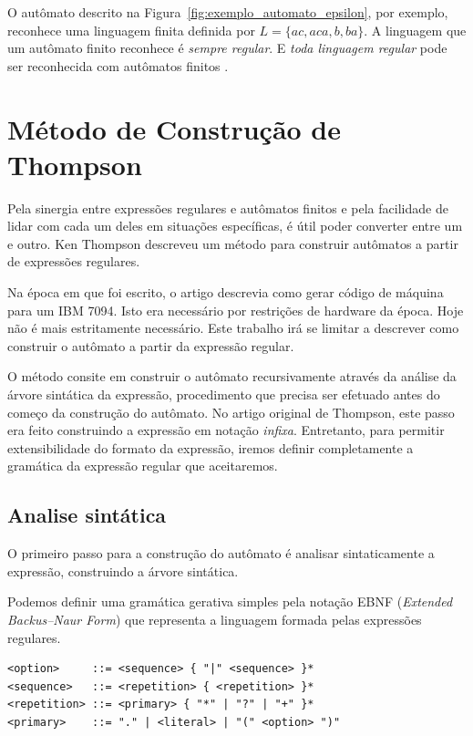 \documentclass[a4paper,12pt,oneside,onecolumn]{uerj}
\begin{document}
O autômato descrito na Figura~\ref{fig:exemplo_automato_epsilon}, por exemplo, reconhece uma linguagem finita definida por $L = \{ac, aca, b, ba\}$. A linguagem que um autômato finito reconhece é \emph{sempre regular}. E \emph{toda linguagem regular} pode ser reconhecida com autômatos finitos \cite{bib:Kleene56}.

\section{Método de Construção de Thompson}

Pela sinergia entre expressões regulares e autômatos finitos e pela facilidade de lidar com cada um deles em situações específicas, é útil poder converter entre um e outro. Ken Thompson \cite{bib:Thompson68} descreveu um método para construir autômatos a partir de expressões regulares.

Na época em que foi escrito, o artigo descrevia como gerar código de máquina para um IBM 7094. Isto era necessário por restrições de hardware da época. Hoje não é mais estritamente necessário. Este trabalho irá se limitar a descrever como construir o autômato a partir da expressão regular.

O método consite em construir o autômato recursivamente através da análise da árvore sintática da expressão, procedimento que precisa ser efetuado antes do começo da construção do autômato. No artigo original de Thompson, este passo era feito construindo a expressão em notação \emph{infixa}. Entretanto, para permitir extensibilidade do formato da expressão, iremos definir completamente a gramática da expressão regular que aceitaremos.

\subsection{Analise sintática}

O primeiro passo para a construção do autômato é analisar sintaticamente a expressão, construindo a árvore sintática. 

Podemos definir uma gramática gerativa simples pela notação EBNF (\emph{Extended Backus–Naur Form}) que representa a linguagem formada pelas expressões regulares.

\begin{verbatim}
<option>     ::= <sequence> { "|" <sequence> }*
<sequence>   ::= <repetition> { <repetition> }*
<repetition> ::= <primary> { "*" | "?" | "+" }*
<primary>    ::= "." | <literal> | "(" <option> ")"
\end{verbatim}
\end{document}
